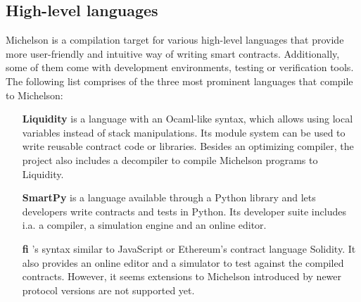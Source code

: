 \subsection{High-level languages}
Michelson is a compilation target for various high-level languages that provide more user-friendly and intuitive way of writing smart contracts. Additionally, some of them come with development environments, testing or verification tools. The following list comprises of the three most prominent languages that compile to Michelson:
\begin{itemize}
\item[\textbf{Liquidity}] is a language with an Ocaml-like syntax, which allows using local variables instead of stack manipulations. Its module system can be used to write reusable contract code or libraries. Besides an optimizing compiler, the project also includes a decompiler to compile Michelson programs to Liquidity. \cite{liquidity}
\item[\textbf{SmartPy}] is a language available through a Python library and lets developers write contracts and tests in Python. Its developer suite includes i.a. a compiler, a simulation engine and an online editor. \cite{smartpy}
\item [\textbf{fi}] 's syntax similar to JavaScript or Ethereum's contract language Solidity. It also provides an online editor and a simulator to test against the compiled contracts. However, it seems extensions to Michelson introduced by newer protocol versions are not supported yet. \cite{https://fi-code.com/}
\end{itemize}
